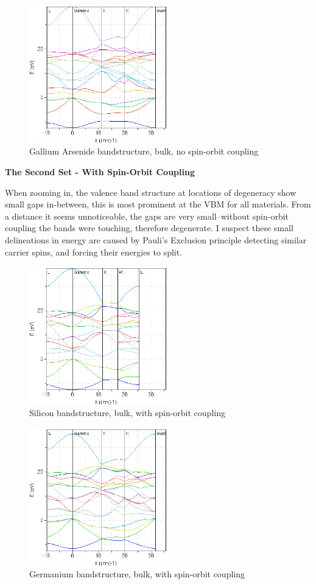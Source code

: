 \documentclass{IEEEtran}
\begin{document}
\begin{figure}[!ht] 
    \centering
    \includegraphics*[width = 6cm]{gaas-bands-firstset.png}
    \caption{Gallium Arsenide bandstructure, bulk, no spin-orbit coupling}
    \label{fig:gaas-first-set}
\end{figure}    

\textbf{The Second Set - With Spin-Orbit Coupling}

When zooming in, the valence band structure at locations of degeneracy show small gaps in-between, this is most prominent at the VBM for all materials. From a distance it seems unnoticeable, the gaps are very small--without spin-orbit coupling the bands were touching, therefore degenerate. I suspect these small delineations in energy are caused by Pauli's Exclusion principle detecting similar carrier spins, and forcing their energies to split.

\begin{figure}[!ht] 
    \centering
    \includegraphics*[width = 6cm]{si-bands-secondset.png}
    \caption{Silicon bandstructure, bulk, with spin-orbit coupling}
    \label{fig:si-second-set}
\end{figure}    

\begin{figure}[!ht] 
    \centering
    \includegraphics*[width = 6cm]{ge-bands-secondset.png}
    \caption{Germanium bandstructure, bulk, with spin-orbit coupling}
    \label{fig:ge-second-set}
\end{figure}    
\end{document}
